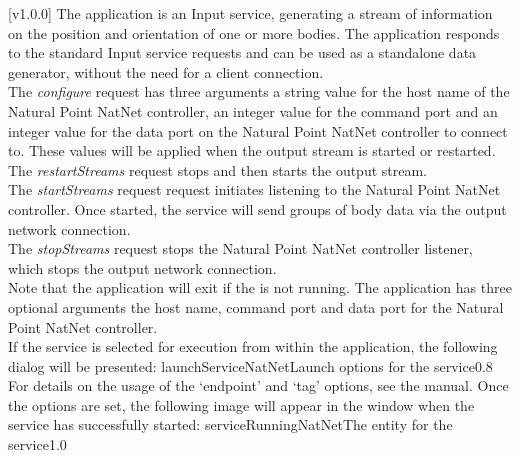 [v1.0.0]
The  application is an Input service,
generating a stream of information on the position and orientation of one or more bodies.
The application responds to the standard Input service requests and can be used as a
standalone data generator, without the need for a client connection.\\

The \emph{configure} request has three arguments \longDash{} a string value for the host
name of the Natural Point NatNet controller, an integer value for the command port and an
integer value for the data port on the Natural Point NatNet controller to connect to.
These values will be applied when the output stream is started or restarted.\\ 

The \emph{restartStreams} request stops and then starts the output stream.\\

The \emph{startStreams} request request initiates listening to the Natural Point NatNet
controller.
Once started, the service will send groups of body data via the output \yarp{} network
connection.\\

The \emph{stopStreams} request stops the Natural Point NatNet controller listener, which
stops the output \yarp{} network connection.\\ 

Note that the application will exit if the \emph{\RS} is not running.
The application has three optional arguments \longDash{} the host name, command port and
data port for the Natural Point NatNet controller.
\insertAppParameters
\insertTagDescription{\NNI}
\insertInputServiceComment\\

\insertStandardServiceCommands
\secondaryEnd
{}
If the service is selected for execution from within the \emph{\MMMU} application, the
following dialog will be presented:
%
{launchServiceNatNet}{Launch options for the \emph{\NNI} service}{0.8}
\condPage{}
For details on the usage of the `endpoint' and `tag' options, see the \emph{\MMMU} manual.
Once the options are set, the following image will appear in the \emph{\MMMU} window when
the service has successfully started:
%
{serviceRunningNatNet}{The \emph{\MMMU} entity for the \emph{\NNI} service}{1.0}


